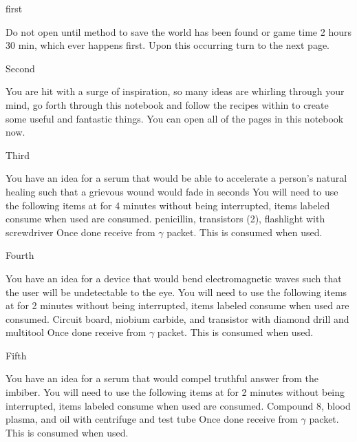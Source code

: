 \documentclass[greennotebook]{guildcamp3} %
\begin{document}
\startnotebook{\nSciOneRecipes{}}

\begin{page}{first}
	
	Do not open until method to save the world has been found or game time 2 hours 30 min, which ever happens first. Upon this occurring turn to the next page.
	
\end{page}

\begin{page}{Second}
	
	You are hit with a surge of inspiration, so many ideas are whirling through your mind, go forth through this notebook and follow the recipes within to create some useful and fantastic things. You can open all of the pages in this notebook now.
	
\end{page}

\begin{page}{Third}
	
	You have an idea for a serum that would be able to accelerate a person's natural healing such that a grievous wound would fade in seconds
	You will need to use the following items at \sSciWorkbench{} for 4 minutes without being interrupted, items labeled consume when used are consumed.
	penicillin, transistors (2), flashlight with screwdriver
	Once done receive \iHealthRemedy{} from $\gamma$ packet. This is consumed when used. 
	
\end{page}

\begin{page}{Fourth}
	
	You have an idea for a device that would bend electromagnetic waves such that the user will be undetectable to the eye.
	You will need to use the following items at \sSciWorkbench{} for 2 minutes without being interrupted, items labeled consume when used are consumed.
	Circuit board, niobium carbide, and transistor with diamond drill and multitool
	Once done receive \iCloakingDevice{} from $\gamma$ packet. This is consumed when used. 
	
\end{page}

\begin{page}{Fifth}
	
	You have an idea for a serum that would compel truthful answer from the imbiber.
	You will need to use the following items at \sSciWorkbench{} for 2 minutes without being interrupted, items labeled consume when used are consumed.
	Compound 8, blood plasma, and oil with centrifuge and test tube
	Once done receive \iTruthSerum{} from $\gamma$ packet. This is consumed when used. 
	
\end{page}
\end{document}

